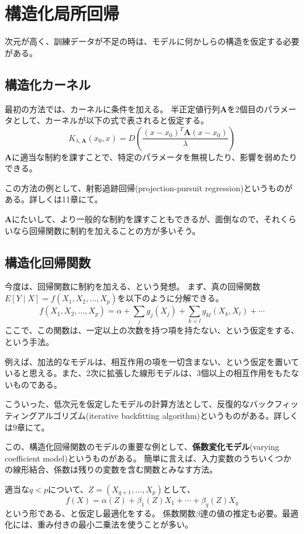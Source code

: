 \documentclass[uplatex]{jsarticle}
\begin{document}
\section{構造化局所回帰}
次元が高く、訓練データが不足の時は、モデルに何かしらの構造を仮定する必要がある。
\subsection{構造化カーネル}
最初の方法では、カーネルに条件を加える。
半正定値行列$\mathbf{A}$を2個目のパラメータとして、カーネルが以下の式で表されると仮定する。
\[
  K_{\lambda,\mathbf{A}}(x_{0},x)=D \left ( \frac{(x-x_{0})^{T}\mathbf{A}(x-x_{0})}{\lambda} \right )
\]
$\mathbf{A}$に適当な制約を課すことで、特定のパラメータを無視したり、影響を弱めたりできる。

この方法の例として、射影追跡回帰(projection-pursuit regression)というものがある。詳しくは11章にて。

$\mathbf{A}$にたいして、より一般的な制約を課すこともできるが、面倒なので、それくらいなら回帰関数に制約を加えることの方が多いそう。

\subsection{構造化回帰関数}
今度は、回帰関数に制約を加える、という発想。
まず、真の回帰関数$E[Y \mid X]=f(X_{1},X_{2}, \dots ,X_{p})$を以下のように分解できる。
\[
  f(X_{1},X_{2}, \dots ,X_{p})=\alpha + \sum_{j}g_{j}(X_{j}) + \sum_{k<l}g_{kl}(X_{k},X_{l}) + \cdots
\]
ここで、この関数は、一定以上の次数を持つ項を持たない、という仮定をする、という手法。

例えば、加法的なモデルは、相互作用の項を一切含まない、という仮定を置いていると思える。また、2次に拡張した線形モデルは、3個以上の相互作用をもたないものである。

こういった、低次元を仮定したモデルの計算方法として、反復的なバックフィッティングアルゴリズム(iterative backfitting algorithm)というものがある。詳しくは9章にて。

この、構造化回帰関数のモデルの重要な例として、\textbf{係数変化モデル}(varying coefficient model)というものがある。
簡単に言えば、入力変数のうちいくつかの線形結合、係数は残りの変数を含む関数とみなす方法。

適当な$q<p$について、$Z=(X_{q+1},\dots,X_{p})$として、
\[
  f(X)=\alpha(Z)+\beta_{1}(Z)X_{1}+\cdots+\beta_{q}(Z)X_{q}
\]
という形である、と仮定し最適化をする。
係数関数$\beta$達の値の推定も必要。最適化には、重み付きの最小二乗法を使うことが多い。
\end{document}
